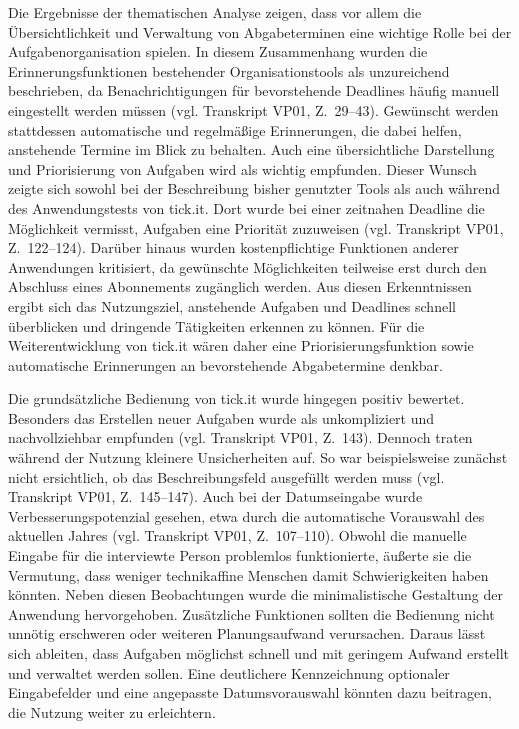 Die Ergebnisse der thematischen Analyse zeigen, dass vor allem die Übersichtlichkeit und Verwaltung von Abgabeterminen eine wichtige Rolle bei der Aufgabenorganisation spielen.
In diesem Zusammenhang wurden die Erinnerungsfunktionen bestehender Organisationstools als unzureichend beschrieben, da Benachrichtigungen für bevorstehende Deadlines häufig manuell eingestellt werden müssen (vgl. Transkript VP01, Z.~29–43).
Gewünscht werden stattdessen automatische und regelmäßige Erinnerungen, die dabei helfen, anstehende Termine im Blick zu behalten.
Auch eine übersichtliche Darstellung und Priorisierung von Aufgaben wird als wichtig empfunden.
Dieser Wunsch zeigte sich sowohl bei der Beschreibung bisher genutzter Tools als auch während des Anwendungstests von tick.it.
Dort wurde bei einer zeitnahen Deadline die Möglichkeit vermisst, Aufgaben eine Priorität zuzuweisen (vgl. Transkript VP01, Z.~122–124).
Darüber hinaus wurden kostenpflichtige Funktionen anderer Anwendungen kritisiert, da gewünschte Möglichkeiten teilweise erst durch den Abschluss eines Abonnements zugänglich werden.
Aus diesen Erkenntnissen ergibt sich das Nutzungsziel, anstehende Aufgaben und Deadlines schnell überblicken und dringende Tätigkeiten erkennen zu können.
Für die Weiterentwicklung von tick.it wären daher eine Priorisierungsfunktion sowie automatische Erinnerungen an bevorstehende Abgabetermine denkbar.

Die grundsätzliche Bedienung von tick.it wurde hingegen positiv bewertet.
Besonders das Erstellen neuer Aufgaben wurde als unkompliziert und nachvollziehbar empfunden (vgl. Transkript VP01, Z.~143).
Dennoch traten während der Nutzung kleinere Unsicherheiten auf.
So war beispielsweise zunächst nicht ersichtlich, ob das Beschreibungsfeld ausgefüllt werden muss (vgl. Transkript VP01, Z.~145–147).
Auch bei der Datumseingabe wurde Verbesserungspotenzial gesehen, etwa durch die automatische Vorauswahl des aktuellen Jahres (vgl. Transkript VP01, Z.~107–110).
Obwohl die manuelle Eingabe für die interviewte Person problemlos funktionierte, äußerte sie die Vermutung, dass weniger technikaffine Menschen damit Schwierigkeiten haben könnten.
Neben diesen Beobachtungen wurde die minimalistische Gestaltung der Anwendung hervorgehoben.
Zusätzliche Funktionen sollten die Bedienung nicht unnötig erschweren oder weiteren Planungsaufwand verursachen.
Daraus lässt sich ableiten, dass Aufgaben möglichst schnell und mit geringem Aufwand erstellt und verwaltet werden sollen.
Eine deutlichere Kennzeichnung optionaler Eingabefelder und eine angepasste Datumsvorauswahl könnten dazu beitragen, die Nutzung weiter zu erleichtern.


